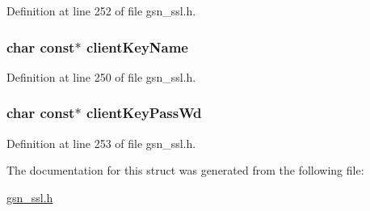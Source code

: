 Definition at line 252 of file gsn\_\-ssl.h.

\hypertarget{a00242_a2203525d961db49ecc3177156556e906}{
\subsubsection[{clientKeyName}]{\setlength{\rightskip}{0pt plus 5cm}char const$\ast$ {\bf clientKeyName}}}
\label{a00242_a2203525d961db49ecc3177156556e906}


Definition at line 250 of file gsn\_\-ssl.h.

\hypertarget{a00242_a7f9f04338bf689b3ec40d031aeae41a9}{
\subsubsection[{clientKeyPassWd}]{\setlength{\rightskip}{0pt plus 5cm}char const$\ast$ {\bf clientKeyPassWd}}}
\label{a00242_a7f9f04338bf689b3ec40d031aeae41a9}


Definition at line 253 of file gsn\_\-ssl.h.



The documentation for this struct was generated from the following file:\begin{DoxyCompactItemize}
\item 
\hyperlink{a00590}{gsn\_\-ssl.h}\end{DoxyCompactItemize}
